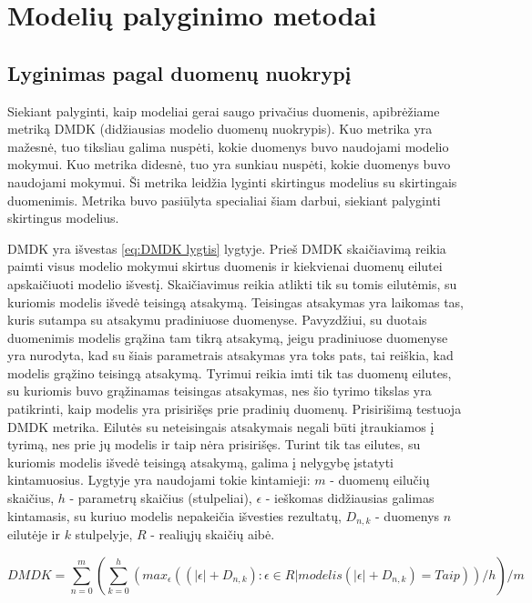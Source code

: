\documentclass{VUMIFInfBakalaurinis}
\begin{document}
\section{Modelių palyginimo metodai}

\subsection{Lyginimas pagal duomenų nuokrypį}

\par Siekiant palyginti, kaip modeliai gerai saugo privačius duomenis, apibrėžiame metriką DMDK (didžiausias modelio duomenų nuokrypis). Kuo metrika yra mažesnė, tuo tiksliau galima nuspėti, kokie duomenys buvo naudojami modelio mokymui. Kuo metrika didesnė, tuo yra sunkiau nuspėti, kokie duomenys buvo naudojami mokymui. Ši metrika leidžia lyginti skirtingus modelius su skirtingais duomenimis. Metrika buvo pasiūlyta specialiai šiam darbui, siekiant palyginti skirtingus modelius.
\par DMDK yra išvestas \eqref{eq:DMDK lygtis} lygtyje. Prieš DMDK skaičiavimą reikia paimti visus modelio mokymui skirtus duomenis ir kiekvienai duomenų eilutei apskaičiuoti modelio išvestį. Skaičiavimus reikia atlikti tik su tomis eilutėmis, su kuriomis modelis išvedė teisingą atsakymą. Teisingas atsakymas yra laikomas tas, kuris sutampa su atsakymu pradiniuose duomenyse. Pavyzdžiui, su duotais duomenimis modelis grąžina tam tikrą atsakymą, jeigu pradiniuose duomenyse yra nurodyta, kad su šiais parametrais atsakymas yra toks pats, tai reiškia, kad modelis grąžino teisingą atsakymą. Tyrimui reikia imti tik tas duomenų eilutes, su kuriomis buvo grąžinamas teisingas atsakymas, nes šio tyrimo tikslas yra patikrinti, kaip modelis yra prisirišęs prie pradinių duomenų. Prisirišimą testuoja DMDK metrika. Eilutės su neteisingais atsakymais negali būti įtraukiamos į tyrimą, nes prie jų modelis ir taip nėra prisirišęs. Turint tik tas eilutes, su kuriomis modelis išvedė teisingą atsakymą, galima į nelygybę įstatyti kintamuosius. Lygtyje yra naudojami tokie kintamieji: $m$ - duomenų eilučių skaičius, $h$ - parametrų skaičius (stulpeliai), $\epsilon$ - ieškomas didžiausias galimas kintamasis, su kuriuo modelis nepakeičia išvesties rezultatų, $D_{n, k}$ - duomenys $n$ eilutėje ir $k$ stulpelyje, $R$ - realiųjų skaičių aibė.

\begin{equation}
DMDK = {\sum_{n=0}^{m} ({\sum_{k=0}^{h} (max_{\epsilon}((|\epsilon| + D_{n, k}) : \epsilon \in R | modelis(|\epsilon| + D_{n, k}) = Taip))}/{h})}/{m}
\label{eq:DMDK lygtis}
\end{equation} 
\end{document}
